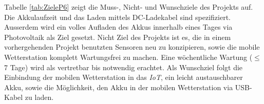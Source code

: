\begin{landscape}
Tabelle \ref{tab:ZieleP6} zeigt die Muss-, Nicht- und Wunschziele des Projekts auf. Die Akkulaufzeit und das Laden mittels DC-Ladekabel sind spezifiziert. Ausserdem wird ein volles Aufladen des Akkus innerhalb eines Tages via Photovoltaik als Ziel gesetzt. Nicht Ziel des Projekts ist es, die in einem vorhergehenden Projekt benutzten Sensoren neu zu konzipieren, sowie die mobile Wetterstation komplett Wartungsfrei zu machen. Eine wöchentliche Wartung ($\leq$ 7 Tage) wird als vertretbar bis notwendig erachtet. Als Wunschziel folgt die Einbindung der mobilen Wetterstation in das \textit{IoT}, ein leicht austauschbarer Akku, sowie die Möglichkeit, den Akku in der mobilen Wetterstation via USB-Kabel zu laden.\\

\end{landscape}
